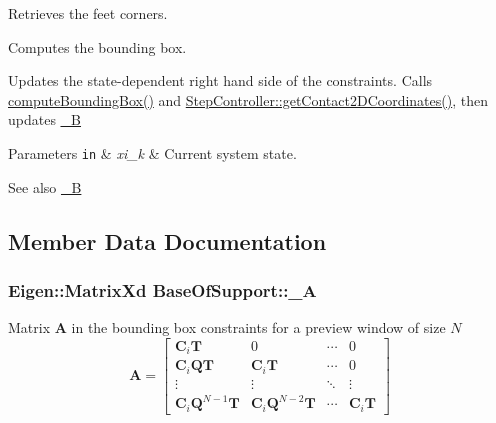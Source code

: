 \begin{DoxyItemize}
\item \-Retrieves the feet corners.
\item \-Computes the bounding box.
\item \-Updates the state-\/dependent right hand side of the constraints. \-Calls \hyperlink{classBaseOfSupport_a8ab32cc933754f6307c7d749189adbfe}{compute\-Bounding\-Box()} and \hyperlink{classStepController_afb77002292921660ef4a44657d6566f1}{\-Step\-Controller\-::get\-Contact2\-D\-Coordinates()}, then updates \hyperlink{classBaseOfSupport_a8dd3c63ff193e5722c93307a952178a8}{\-\_\-\-B}
\end{DoxyItemize}


\begin{DoxyParams}[1]{\-Parameters}
\mbox{\tt in}  & {\em xi\-\_\-k} & \-Current system state.\\
\hline
\end{DoxyParams}
\begin{DoxySeeAlso}{\-See also}
\hyperlink{classBaseOfSupport_a8dd3c63ff193e5722c93307a952178a8}{\-\_\-\-B} 
\end{DoxySeeAlso}


\subsection{\-Member \-Data \-Documentation}
\hypertarget{classBaseOfSupport_a54a35d087a8dfaee9a27d025d46f706d}{
\subsubsection[{\-\_\-\-A}]{\setlength{\rightskip}{0pt plus 5cm}\-Eigen\-::\-Matrix\-Xd {\bf \-Base\-Of\-Support\-::\-\_\-\-A}}}\label{classBaseOfSupport_a54a35d087a8dfaee9a27d025d46f706d}
\-Matrix $\mathbf{A}$ in the bounding box constraints for a preview window of size $N$ \[ \mathbf{A} = \left[\begin{array}{cccc} \mathbf{C}_i\mathbf{T} & 0 & \cdots & 0 \\ \mathbf{C}_i\mathbf{Q}\mathbf{T} & \mathbf{C}_i\mathbf{T} & \cdots & 0 \\ \vdots & \vdots & \ddots & \vdots \\ \mathbf{C}_i\mathbf{Q}^{N-1}\mathbf{T} & \mathbf{C}_i\mathbf{Q}^{N-2}\mathbf{T} & \cdots & \mathbf{C}_i\mathbf{T} \end{array}\right] \]

